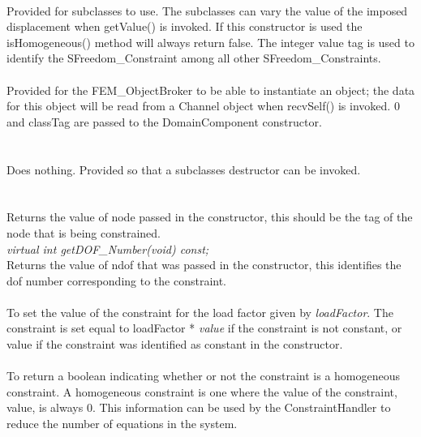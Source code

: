  \\
Provided for subclasses to use. The subclasses can vary the value of the
imposed displacement when getValue() is invoked. If this
constructor is used the isHomogeneous() method will always
return \p false. The integer value \p tag is used to identify
the SFreedom\_Constraint among all other SFreedom\_Constraints. \\


 \\
Provided for the FEM\_ObjectBroker to be able to instantiate an
object; the data for this object will be read from a Channel object
when recvSelf() is invoked. $0$ and \p classTag are passed to
the DomainComponent constructor. \\


  \\
 \\
Does nothing. Provided so that a subclasses destructor can be
invoked. \\


  \\
 \\
Returns the value of \p node passed in the constructor, this should be 
the tag of the node that is being constrained. \\

{\em virtual int getDOF\_Number(void) const;} \\
Returns the value of \p ndof that was passed in the constructor,
this identifies the dof number corresponding to the constraint. \\

\\ 
To set the value of the constraint for the load factor given by {\em
loadFactor}. The constraint is set equal to \p loadFactor * {\em
value} if the constraint is not constant, or \p value if the
constraint was identified as constant in the constructor. \\

\\
To return a boolean indicating whether or not the constraint is a
homogeneous constraint. A homogeneous constraint is one where the value
of the constraint, \p value, is always $0$. This information can be used by the
ConstraintHandler to reduce the number of equations in the system. \\

